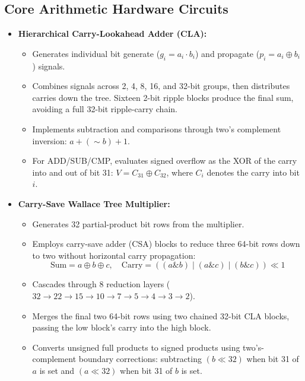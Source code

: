 \documentclass[11pt,a4paper]{article}
\begin{document}
\subsection{Core Arithmetic Hardware Circuits}
\begin{itemize}
    \item \textbf{Hierarchical Carry-Lookahead Adder (CLA):}
    \begin{itemize}
        \item Generates individual bit generate ($g_i = a_i \cdot b_i$) and propagate ($p_i = a_i \oplus b_i$) signals.
        \item Combines signals across 2, 4, 8, 16, and 32-bit groups, then distributes carries down the tree. Sixteen 2-bit ripple blocks produce the final sum, avoiding a full 32-bit ripple-carry chain.
        \item Implements subtraction and comparisons through two's complement inversion: $a + (\sim b) + 1$.
        \item For ADD/SUB/CMP, evaluates signed overflow as the XOR of the carry into and out of bit 31: $V = C_{31} \oplus C_{32}$, where $C_i$ denotes the carry into bit $i$.
    \end{itemize}
    
    \item \textbf{Carry-Save Wallace Tree Multiplier:}
    \begin{itemize}
        \item Generates 32 partial-product bit rows from the multiplier.
        \item Employs carry-save adder (CSA) blocks to reduce three 64-bit rows down to two without horizontal carry propagation:
        \begin{equation*}
            \text{Sum} = a \oplus b \oplus c, \quad \text{Carry} = ((a \mathbin{\&} b) \mathbin{|} (a \mathbin{\&} c) \mathbin{|} (b \mathbin{\&} c)) \ll 1
        \end{equation*}
        \item Cascades through 8 reduction layers ($32 \rightarrow 22 \rightarrow 15 \rightarrow 10 \rightarrow 7 \rightarrow 5 \rightarrow 4 \rightarrow 3 \rightarrow 2$).
        \item Merges the final two 64-bit rows using two chained 32-bit CLA blocks, passing the low block's carry into the high block.
        \item Converts unsigned full products to signed products using two's-complement boundary corrections: subtracting $(b \ll 32)$ when bit 31 of $a$ is set and $(a \ll 32)$ when bit 31 of $b$ is set.
    \end{itemize}
    

\end{itemize}
\end{document}
